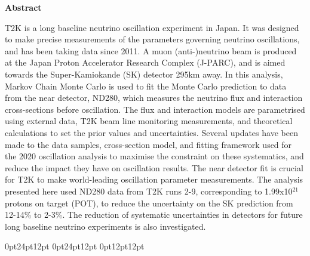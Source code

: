 \begin{center}
\textbf{Abstract} 
\newline
\end{center}

T2K is a long baseline neutrino oscillation experiment in Japan. It was designed to make precise measurements of the parameters governing neutrino oscillations, and has been taking data since 2011. A muon (anti-)neutrino beam is produced at the Japan Proton Accelerator Research Complex (J-PARC), and is aimed towards the Super-Kamiokande (SK) detector 295km away. In this analysis, Markov Chain Monte Carlo is used to fit the Monte Carlo prediction to data from the near detector, ND280, which measures the neutrino flux and interaction cross-sections before oscillation. The flux and interaction models are parametrised using external data, T2K beam line monitoring measurements, and theoretical calculations to set the prior values and uncertainties. Several updates have been made to the data samples, cross-section model, and fitting framework used for the 2020 oscillation analysis to maximise the constraint on these systematics, and reduce the impact they have on oscillation results. The near detector fit is crucial for T2K to make world-leading oscillation parameter measurements. The analysis presented here used ND280 data from T2K runs 2-9, corresponding to 1.99x10$^{21}$ protons on target (POT), to reduce the uncertainty on the SK prediction from 12-14$\%$ to 2-3$\%$. The reduction of systematic uncertainties in detectors for future long baseline neutrino experiments is also investigated. 

\newpage
\tableofcontents
\newpage
\listoffigures
\newpage
\listoftables
\newpage
\mainmatter
{}
\parskip 0pt
\titlespacing*{\chapter}
{0pt}{24pt}{12pt}
\titlespacing*{\section}
{0pt}{24pt}{12pt}
\titlespacing*{\subsection}
{0pt}{12pt}{12pt}